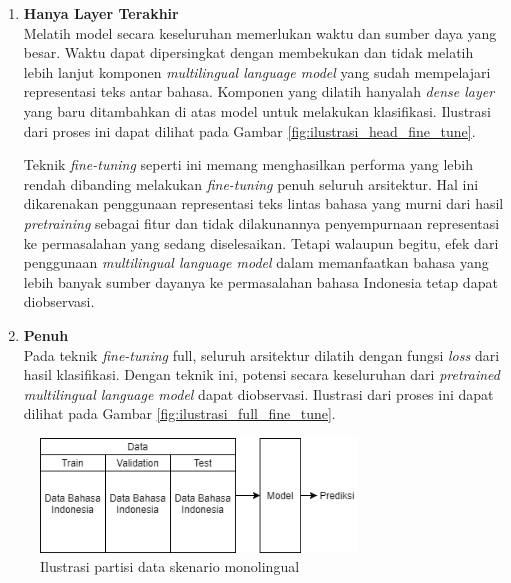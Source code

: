	\begin{enumerate}
		\item \textbf{Hanya Layer Terakhir}\\	
		Melatih	model secara keseluruhan memerlukan waktu dan sumber daya yang besar. Waktu dapat dipersingkat dengan membekukan dan tidak melatih lebih lanjut komponen \textit{multilingual language model} yang sudah mempelajari representasi teks antar bahasa. Komponen yang dilatih hanyalah \textit{dense layer} yang baru ditambahkan di atas model untuk melakukan klasifikasi. Ilustrasi dari proses ini dapat dilihat pada Gambar \ref{fig:ilustrasi_head_fine_tune}.

		Teknik \textit{fine-tuning} seperti ini memang menghasilkan performa yang lebih rendah dibanding melakukan \textit{fine-tuning} penuh seluruh arsitektur. Hal ini dikarenakan penggunaan representasi teks lintas bahasa yang murni dari hasil \textit{pretraining} sebagai fitur dan tidak dilakunannya penyempurnaan representasi ke permasalahan yang sedang diselesaikan. Tetapi walaupun begitu, efek dari penggunaan \textit{multilingual language model} dalam memanfaatkan bahasa yang lebih banyak sumber dayanya ke permasalahan bahasa Indonesia tetap dapat diobservasi.

		\item \textbf{Penuh}\\
		Pada teknik \textit{fine-tuning} full, seluruh arsitektur dilatih dengan fungsi \textit{loss} dari hasil klasifikasi. Dengan teknik ini, potensi secara keseluruhan dari \textit{pretrained multilingual language model} dapat diobservasi. Ilustrasi dari proses ini dapat dilihat pada Gambar \ref{fig:ilustrasi_full_fine_tune}.
		
	\end{enumerate}

	\begin{figure}[]
		\centering
		\includegraphics[width=0.75\textwidth]{resources/Data-tipe-A.png}
		\caption{Ilustrasi partisi data skenario monolingual}
		\label{fig:data_tipe_a}
	\end{figure}

